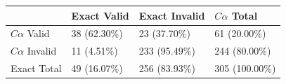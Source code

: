 \begin{tabular}{llll}
\toprule
 & Exact Valid & Exact Invalid & $C\alpha$ Total \\
\midrule
$C\alpha$ Valid & 38 (62.30\%) & 23 (37.70\%) & 61 (20.00\%) \\
$C\alpha$ Invalid & 11 (4.51\%) & 233 (95.49\%) & 244 (80.00\%) \\
Exact Total & 49 (16.07\%) & 256 (83.93\%) & 305 (100.00\%) \\
\bottomrule
\end{tabular}
